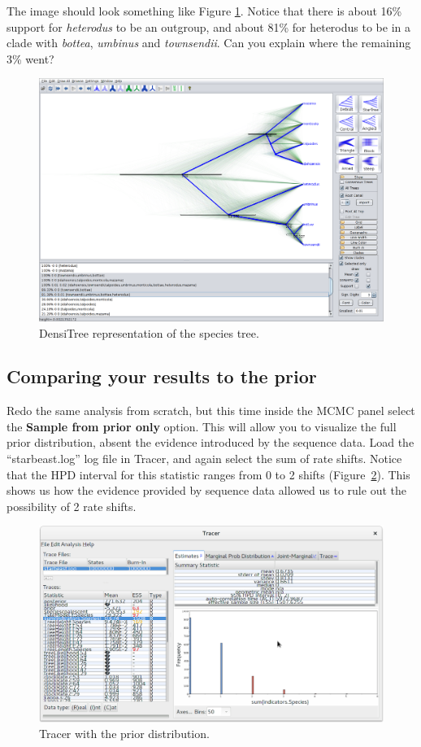 \documentclass{article}
\begin{document}
The image should look something like Figure \ref{fig:densitree}. Notice that
there is about 16\% support for \textit{heterodus} to be an outgroup, and about
81\% for heterodus to be in a clade with \textit{bottea}, \textit{umbinus} and
\textit{townsendii}. Can you explain where the remaining 3\% went?

\begin{figure}
\centering
\includegraphics[width=\textwidth]{figures/densitree.png}
\caption{DensiTree representation of the species tree.}
\label{fig:densitree}
\end{figure}

\subsection*{Comparing your results to the prior}

Redo the same analysis from scratch, but this time inside the MCMC panel select
the \textbf{Sample from prior only} option. This will allow you to visualize the
full prior distribution, absent the evidence introduced by the sequence data.
Load the ``starbeast.log'' log file in Tracer, and again select the sum of rate
shifts. Notice that the HPD interval for this statistic ranges from 0 to 2
shifts (Figure~\ref{fig:tracerPrior}). This shows us how the evidence provided
by sequence data allowed us to rule out the possibility of 2 rate shifts.

\begin{figure}[htb!]
\centering
\includegraphics[width=\textwidth]{figures/tracer-prior.png}
\caption{Tracer with the prior distribution.}
\label{fig:tracerPrior}
\end{figure}

\clearpage



\end{document}
